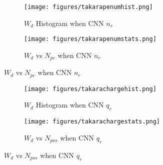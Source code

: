 \begin{figure}[H]
\begin{minipage}{.5\textwidth}
\begin{figure}[H]
    \centering
        \texttt{[image: figures/takarapenumhist.png]}
    \caption{$W_{d}$ Histogram when CNN $n_{r}$}
\end{figure}
\end{minipage}
\begin{minipage}{.5\textwidth}
\begin{figure}[H]
    \centering
        \texttt{[image: figures/takarapenumstats.png]}
    \caption{$W_{d}$ vs $N_{pe}$ when CNN $n_{r}$}
\end{figure}
\end{minipage}
\end{figure}
\begin{figure}[H]
\begin{minipage}{.5\textwidth}
\begin{figure}[H]
    \centering
        \texttt{[image: figures/takarachargehist.png]}
    \caption{$W_{d}$ Histogram when CNN $q_{r}$}
\end{figure}
\end{minipage}
\begin{minipage}{.5\textwidth}
\begin{figure}[H]
    \centering
        \texttt{[image: figures/takarachargestats.png]}
    \caption{$W_{d}$ vs $N_{pos}$ when CNN $q_{r}$}
\end{figure}
\end{minipage}
\end{figure}

